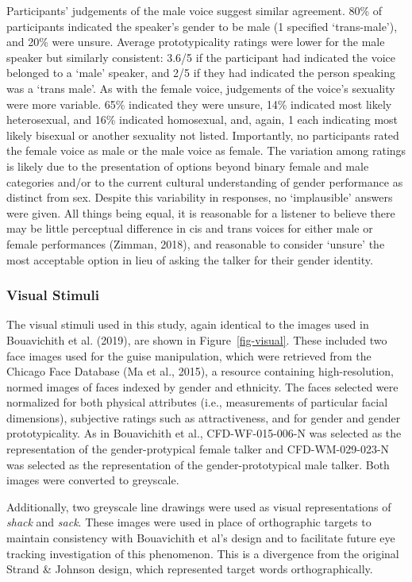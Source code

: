 \documentclass[
  letterpaper,
  DIV=11,
  numbers=noendperiod]{scrartcl}
\begin{document}
Participants' judgements of the male voice suggest similar agreement.
80\% of participants indicated the speaker's gender to be male (1
specified `trans-male'), and 20\% were unsure. Average prototypicality
ratings were lower for the male speaker but similarly consistent: 3.6/5
if the participant had indicated the voice belonged to a `male' speaker,
and 2/5 if they had indicated the person speaking was a `trans male'. As
with the female voice, judgements of the voice's sexuality were more
variable. 65\% indicated they were unsure, 14\% indicated most likely
heterosexual, and 16\% indicated homosexual, and, again, 1 each
indicating most likely bisexual or another sexuality not listed.
Importantly, no participants rated the female voice as male or the male
voice as female. The variation among ratings is likely due to the
presentation of options beyond binary female and male categories and/or
to the current cultural understanding of gender performance as distinct
from sex. Despite this variability in responses, no `implausible'
answers were given. All things being equal, it is reasonable for a
listener to believe there may be little perceptual difference in cis and
trans voices for either male or female performances (Zimman, 2018), and
reasonable to consider `unsure' the most acceptable option in lieu of
asking the talker for their gender identity.

\subsubsection{Visual Stimuli}\label{sec-stimuli-visual}

The visual stimuli used in this study, again identical to the images
used in Bouavichith et al. (2019), are shown in Figure~\ref{fig-visual}.
These included two face images used for the guise manipulation, which
were retrieved from the Chicago Face Database (Ma et al., 2015), a
resource containing high-resolution, normed images of faces indexed by
gender and ethnicity. The faces selected were normalized for both
physical attributes (i.e., measurements of particular facial
dimensions), subjective ratings such as attractiveness, and for gender
and gender prototypicality. As in Bouavichith et al., CFD-WF-015-006-N
was selected as the representation of the gender-protypical female
talker and CFD-WM-029-023-N was selected as the representation of the
gender-prototypical male talker. Both images were converted to
greyscale.

Additionally, two greyscale line drawings were used as visual
representations of \emph{shack} and \emph{sack}. These images were used
in place of orthographic targets to maintain consistency with
Bouavichith et al's design and to facilitate future eye tracking
investigation of this phenomenon. This is a divergence from the original
Strand \& Johnson design, which represented target words
orthographically.
\end{document}
